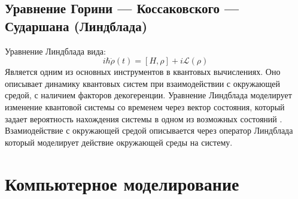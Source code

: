 \documentclass[12pt, a4paper]{article}
\begin{document}
\subsection{Уравнение Горини — Коссаковского — Сударшана (Линдблада)}
Уравнение Линдблада вида:
\[i\hbar\dot\rho(t)=[H,\rho]+i\mathcal{L}(\rho)\]
\qquad Является одним из основных инструментов в квантовых вычислениях. Оно описывает динамику квантовых систем при взаимодействии с окружающей средой, с наличием факторов декогеренции.
\newline
\null
\qquad
Уравнение Линдблада моделирует изменение квантовой системы со временем через вектор состояния, который задает вероятность нахождения системы в одном из возможных состояний . Взамиодействие с окружающей средой описывается через оператор Линдблада который моделирует действие окружающей среды на систему.
\section{Компьютерное моделирование}
\end{document}
